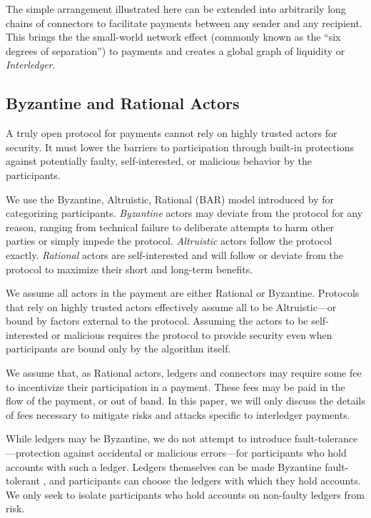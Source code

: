 \documentclass[letterpaper,twocolumn,10pt]{article}
\begin{document}
The simple arrangement illustrated here can be extended into arbitrarily long chains of connectors to facilitate payments between any sender and any recipient. This brings the the small-world network effect (commonly known as the ``six degrees of separation'') \cite{albert1999internet,watts1998collective} to payments and creates a global graph of liquidity or \mbox{\textit{Interledger}}.

\subsection{Byzantine and Rational Actors}

A truly open protocol for payments cannot rely on highly trusted actors for security. It must lower the barriers to participation through built-in protections against potentially faulty, self-interested, or malicious behavior by the participants.

We use the Byzantine, Altruistic, Rational (BAR) model introduced by \cite{aiyer2005bar} for categorizing participants. \textit{Byzantine} actors may deviate from the protocol for any reason, ranging from technical failure to deliberate attempts to harm other parties or simply impede the protocol. \textit{Altruistic} actors follow the protocol exactly. \textit{Rational} actors are self-interested and will follow or deviate from the protocol to maximize their short and long-term benefits.

We assume all actors in the payment are either Rational or Byzantine. Protocols that rely on highly trusted actors effectively assume all to be Altruistic---or bound by factors external to the protocol. Assuming the actors to be self-interested or malicious requires the protocol to provide security even when participants are bound only by the algorithm itself.

We assume that, as Rational actors, ledgers and connectors may require some fee to incentivize their participation in a payment. These fees may be paid in the flow of the payment, or out of band. In this paper, we will only discuss the details of fees necessary to mitigate risks and attacks specific to interledger payments.

While ledgers may be Byzantine, we do not attempt to introduce fault-tolerance---protection against accidental or malicious errors---for participants who hold accounts with such a ledger. Ledgers themselves can be made Byzantine fault-tolerant \cite{mazieresstellar,Bitcoin,schwartz2014ripple}, and participants can choose the ledgers with which they hold accounts. We only seek to isolate participants who hold accounts on non-faulty ledgers from risk.
\end{document}
